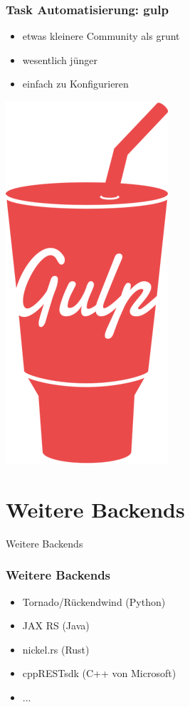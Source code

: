 \documentclass{beamer}
\begin{document}
\begin{frame}
\frametitle{Task Automatisierung: gulp}
\begin{itemize}
\item etwas kleinere Community als grunt
\item wesentlich jünger
\item einfach zu Konfigurieren
\end{itemize}
\centerline{\includegraphics[scale=0.27]{assets/gulp.png}}
\end{frame}





\section{Weitere Backends}

\begin{frame}
\Huge{
\centerline{Weitere Backends}
}
\end{frame}


\begin{frame}
\frametitle{Weitere Backends}
\begin{itemize}
\item Tornado/Rückendwind (Python)
\item JAX RS (Java)
\item nickel.rs (Rust)
\item cppRESTsdk (C++ von Microsoft)
\item ...
\end{itemize}
\end{frame}
\end{document}
